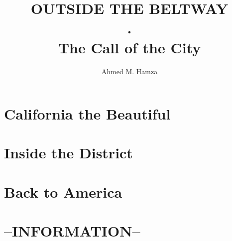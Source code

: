 \documentclass{book}
\begin{document}
\author{Ahmed M. Hamza}
\title{OUTSIDE THE BELTWAY\\.\\The Call of the City}

\maketitle

\tableofcontents

\part{California the Beautiful}


\part{Inside the District}


\part{Back to America}


\part{--INFORMATION--}
\end{document}
